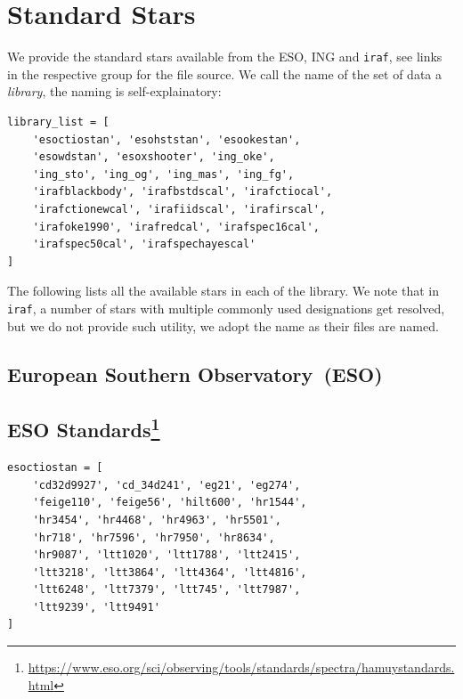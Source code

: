 \documentclass[fleqn,usenatbib]{mnras}
\begin{document}






\appendix

\section{Standard Stars}
\label{appendix:standards}
We provide the standard stars available from the ESO, ING and \texttt{iraf}, see
links in the respective group for the file source. We call the name of the set of
data a \textit{library}, the naming is self-explainatory:

\begin{verbatim}
library_list = [
    'esoctiostan', 'esohststan', 'esookestan',
    'esowdstan', 'esoxshooter', 'ing_oke',
    'ing_sto', 'ing_og', 'ing_mas', 'ing_fg',
    'irafblackbody', 'irafbstdscal', 'irafctiocal',
    'irafctionewcal', 'irafiidscal', 'irafirscal',
    'irafoke1990', 'irafredcal', 'irafspec16cal',
    'irafspec50cal', 'irafspechayescal'
]
\end{verbatim}

The following lists all the available stars in each of the library. We note that
in \texttt{iraf}, a number of stars with multiple commonly used designations
get resolved, but we do not provide such utility, we adopt the name as their
files are named.

\subsection{European Southern Observatory~(ESO)}

\subsection*{ESO \citet{1992PASP..104..533H, 1994PASP..106..566H} Standards\footnote{\url{https://www.eso.org/sci/observing/tools/standards/spectra/hamuystandards.html}}}
\begin{verbatim}
esoctiostan = [
    'cd32d9927', 'cd_34d241', 'eg21', 'eg274',
    'feige110', 'feige56', 'hilt600', 'hr1544',
    'hr3454', 'hr4468', 'hr4963', 'hr5501',
    'hr718', 'hr7596', 'hr7950', 'hr8634',
    'hr9087', 'ltt1020', 'ltt1788', 'ltt2415',
    'ltt3218', 'ltt3864', 'ltt4364', 'ltt4816',
    'ltt6248', 'ltt7379', 'ltt745', 'ltt7987',
    'ltt9239', 'ltt9491'
]
\end{verbatim}
\end{document}

